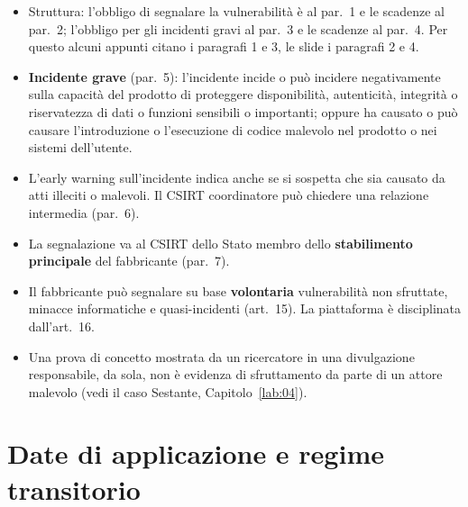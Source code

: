 \begin{integrazione}
\begin{itemize}
  \item Struttura: l'obbligo di segnalare la vulnerabilità è al par.~1 e le scadenze al par.~2; l'obbligo
    per gli incidenti gravi al par.~3 e le scadenze al par.~4. Per questo alcuni appunti citano i
    paragrafi 1 e 3, le slide i paragrafi 2 e 4.
  \item \textbf{Incidente grave} (par.~5): l'incidente incide o può incidere negativamente sulla capacità
    del prodotto di proteggere disponibilità, autenticità, integrità o riservatezza di dati o funzioni
    sensibili o importanti; oppure ha causato o può causare l'introduzione o l'esecuzione di codice
    malevolo nel prodotto o nei sistemi dell'utente.
  \item L'early warning sull'incidente indica anche se si sospetta che sia causato da atti illeciti o
    malevoli. Il CSIRT coordinatore può chiedere una relazione intermedia (par.~6).
  \item La segnalazione va al CSIRT dello Stato membro dello \textbf{stabilimento principale} del
    fabbricante (par.~7).
  \item Il fabbricante può segnalare su base \textbf{volontaria} vulnerabilità non sfruttate, minacce
    informatiche e quasi-incidenti (art.~15). La piattaforma è disciplinata dall'art.~16.
  \item Una prova di concetto mostrata da un ricercatore in una divulgazione responsabile, da sola, non è
    evidenza di sfruttamento da parte di un attore malevolo (vedi il caso Sestante, Capitolo~\ref{lab:04}).
\end{itemize}
\end{integrazione}

\section{Date di applicazione e regime transitorio}
\label{sec:cra-date}


